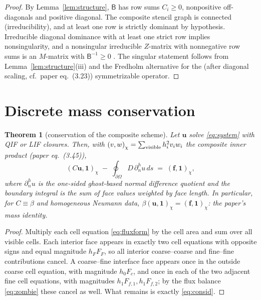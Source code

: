 \documentclass[11pt]{article}
\newtheorem{theorem}{Theorem}[section]
\theoremstyle{remark}
\newcommand{\ip}[2]{\left(#1,#2\right)_\chi}
\begin{document}
\begin{proof}
By Lemma~\ref{lem:structure}, $\mathsf B$ has row sums $C_i\ge 0$,
nonpositive off-diagonals and positive diagonal.  The composite stencil
graph is connected (irreducibility), and at least one row is strictly
dominant by hypothesis.  Irreducible diagonal dominance with at least
one strict row implies nonsingularity, and a nonsingular irreducible
$Z$-matrix with nonnegative row sums is an $M$-matrix with
$\mathsf B^{-1}\ge 0$ \cite[Ch.~6]{BermanPlemmons}.  The singular
statement follows from Lemma~\ref{lem:structure}(iii) and the Fredholm
alternative for the (after diagonal scaling, cf.\ paper eq.~(3.23))
symmetrizable operator.
\end{proof}

\section{Discrete mass conservation}

\begin{theorem}[conservation of the composite scheme]\label{thm:cons}
Let $\mathbf u$ solve \eqref{eq:system} with QIF or LIF closures.  Then,
with $\ip{v}{w}=\sum_{\rm visible}h_i^2v_iw_i$ the composite inner
product (paper eq.~(3.45)),
\begin{equation}\label{eq:consid}
  \ip{C\mathbf u}{\mathbf 1} \;-\;
  \oint_{\partial\Omega} D\,\partial_n^h u \,ds
  \;=\;\ip{\mathbf f}{\mathbf 1},
\end{equation}
where $\partial_n^h u$ is the one-sided ghost-based normal difference
quotient and the boundary integral is the sum of face values weighted by
face length.  In particular, for $C\equiv\beta$ and homogeneous Neumann
data, $\beta\ip{\mathbf u}{\mathbf 1}=\ip{\mathbf f}{\mathbf 1}$: the
paper's mass identity.
\end{theorem}

\begin{proof}
Multiply each cell equation \eqref{eq:fluxform} by the cell area and sum
over all visible cells.  Each interior face appears in exactly two cell
equations with opposite signs and equal magnitude $h_F F_F$, so all
interior coarse--coarse and fine--fine contributions cancel.  A
coarse--fine interface face appears once in the outside coarse cell
equation, with magnitude $h_0F_c$, and once in each of the two adjacent
fine cell equations, with magnitudes $h_1F_{f,1},h_1F_{f,2}$; by the
flux balance \eqref{eq:zombie} these cancel as well.  What remains is
exactly \eqref{eq:consid}.
\end{proof}
\end{document}
